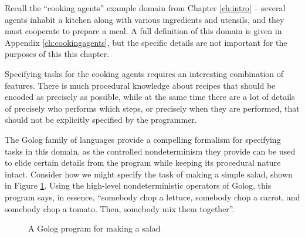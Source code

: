 Recall the {}``cooking agents'' example domain from Chapter \ref{ch:intro}
-- several agents inhabit a kitchen along with various ingredients
and utensils, and they must cooperate to prepare a meal. A full definition
of this domain is given in Appendix \ref{ch:cookingagents}, but the
specific details are not important for the purposes of this this chapter.

Specifying tasks for the cooking agents requires an interesting combination
of features. There is much procedural knowledge about recipes that
should be encoded as precisely as possible, while at the same time
there are a lot of details of precisely who performs which steps,
or precisely when they are performed, that should not be explicitly
specified by the programmer.

The Golog family of languages provide a compelling formalism for specifying
tasks in this domain, as the controlled nondeterminism they provide
can be used to elide certain details from the program while keeping
its procedural nature intact. Consider how we might specify the task
of making a simple salad, shown in Figure \ref{fig:MIndiGolog:MakeSalad}.
Using the high-level nondeterministic operators of Golog, this program
says, in essence, {}``somebody chop a lettuce, somebody chop a carrot,
and somebody chop a tomato. Then, somebody mix them together''.

%
\begin{figure}[!t]
\begin{centering}
\par\end{centering}

\caption{A Golog program for making a salad\label{fig:MIndiGolog:MakeSalad}}

\end{figure}


